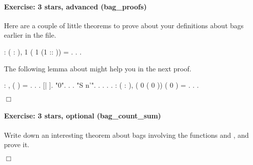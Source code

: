 \documentclass[12pt]{report}
\begin{document}
\paragraph{Exercise: 3 stars, advanced (bag\_proofs)}

 Here are a couple of little theorems to prove about your
    definitions about bags earlier in the file. \begin{coqdoccode}
\coqdocemptyline
\coqdocnoindent
{}  : \coqdockw{\ensuremath{\forall}} ( : ),\coqdoceol
\coqdocindent{1.00em}
 1 ( 1 (1 :: )) = .\coqdoceol
\coqdocnoindent
{}.\coqdoceol
 .\coqdoceol
\coqdocemptyline
\end{coqdoccode}
The following lemma about  might help you in the next proof. \begin{coqdoccode}
\coqdocemptyline
\coqdocnoindent
{}  : \coqdockw{\ensuremath{\forall}} ,\coqdoceol
\coqdocindent{1.00em}
  ( ) = .\coqdoceol
\coqdocnoindent
{}.\coqdoceol
\coqdocindent{1.00em}
 .    [| ].\coqdoceol
\coqdocindent{1.00em}
 "0".\coqdoceol
\coqdocindent{2.00em}
. .\coqdoceol
\coqdocindent{1.00em}
 "S n'".\coqdoceol
\coqdocindent{2.00em}
.  . . .\coqdoceol
\coqdocemptyline
\coqdocnoindent
{} : \coqdockw{\ensuremath{\forall}} ( : ),\coqdoceol
\coqdocindent{1.00em}
 ( 0 ( 0 )) ( 0 ) = .\coqdoceol
\coqdocnoindent
{}.\coqdoceol
 .\coqdoceol
\end{coqdoccode}
\ensuremath{\Box} 

\paragraph{Exercise: 3 stars, optional (bag\_count\_sum)}

 Write down an interesting theorem  about bags 
    involving the functions  and , and prove it.\begin{coqdoccode}
\coqdocemptyline
\end{coqdoccode}
\ensuremath{\Box} 
\end{document}
